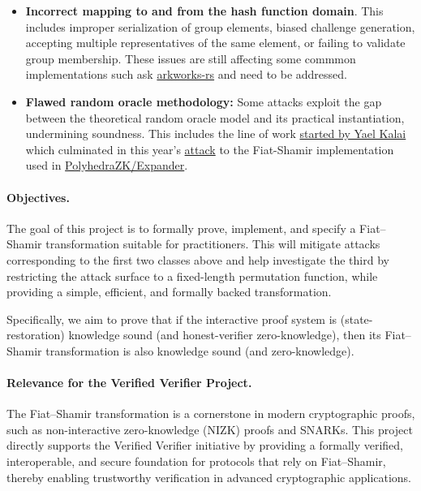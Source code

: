 \documentclass{article}
\begin{document}
\begin{itemize}
    \item \textbf{Incorrect mapping to and from the hash function domain}. This includes improper serialization of group elements, biased challenge generation, accepting multiple representatives of the same element, or failing to validate group membership. These issues are still affecting some commmon implementations such ask \href{https://github.com/arkworks-rs/crypto-primitives/blob/main/crypto-primitives/src/snark/constraints.rs#L163}{arkworks-rs} and need to be addressed.

    \item \textbf{Flawed random oracle methodology:} Some attacks exploit the gap between the theoretical random oracle model and its practical instantiation, undermining soundness. This includes the line of work \href{https://dl.acm.org/doi/10.5555/946243.946302}{started by Yael Kalai} which culminated in this year's \href{https://eprint.iacr.org/2025/118}{attack} to the Fiat-Shamir implementation used in \href{https://github.com/PolyhedraZK/Expander/}{PolyhedraZK/Expander}.
\end{itemize}


\paragraph{Objectives.}
The goal of this project is to formally prove, implement, and specify a Fiat--Shamir transformation suitable for practitioners. This will mitigate attacks corresponding to the first two classes above and help investigate the third by restricting the attack surface to a fixed-length permutation function, while providing a simple, efficient, and formally backed transformation.

Specifically, we aim to prove that if the interactive proof system is (state-restoration) knowledge sound (and honest-verifier zero-knowledge), then its Fiat--Shamir transformation is also knowledge sound (and zero-knowledge).



\paragraph{Relevance for the Verified Verifier Project.} The Fiat--Shamir transformation is a cornerstone in modern cryptographic proofs, such as non-interactive zero-knowledge (NIZK) proofs and SNARKs. This project directly supports the Verified Verifier initiative by providing a formally verified, interoperable, and secure foundation for protocols that rely on Fiat--Shamir, thereby enabling trustworthy verification in advanced cryptographic applications.
\end{document}
